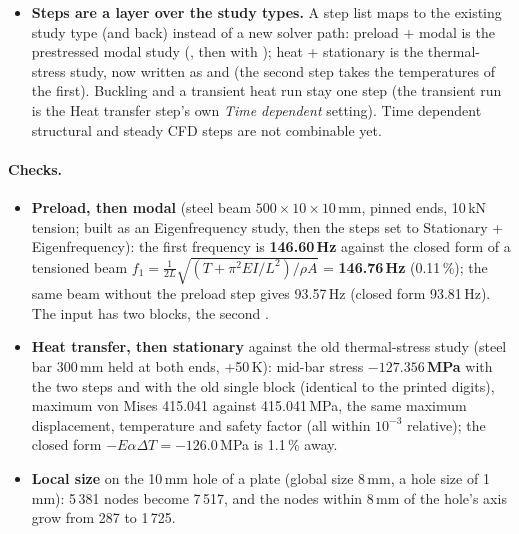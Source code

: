 \begin{itemize}[nosep]
        is refused with the reason. Gmsh is not installed here, so the Gmsh route is not built. The mesh worker of the
        mesh-time work passes the property on.
  \item \textbf{Steps are a layer over the study types.} A step list maps to the existing study type (and back) instead of a new
        solver path: preload + modal is the prestressed modal study (, then  with
        ); heat + stationary is the thermal-stress study, now written as 
        and  (the second step takes the temperatures of the first). Buckling and a transient heat run stay one
        step (the transient run is the Heat transfer step's own \emph{Time dependent} setting). Time dependent structural and
        steady CFD steps are not combinable yet.
\end{itemize}

\paragraph{Checks.}
\begin{itemize}[nosep]
  \item \textbf{Preload, then modal} (steel beam $500\times10\times10$\,mm, pinned ends, 10\,kN tension; built as an
        Eigenfrequency study, then the steps set to Stationary + Eigenfrequency): the first frequency is
        \textbf{146.60\,Hz} against the closed form of a tensioned beam $f_1=\tfrac{1}{2L}\sqrt{(T+\pi^2EI/L^2)/\rho A}$
        = \textbf{146.76\,Hz} (0.11\,\%); the same beam without the preload step gives 93.57\,Hz (closed form 93.81\,Hz).
        The input has two  blocks, the second .
  \item \textbf{Heat transfer, then stationary} against the old thermal-stress study (steel bar 300\,mm held at both ends,
        +50\,K): mid-bar stress \textbf{$-127.356$\,MPa} with the two steps and with the old single block (identical to the
        printed digits), maximum von Mises 415.041 against 415.041\,MPa, the same maximum displacement, temperature and
        safety factor (all within $10^{-3}$ relative); the closed form $-E\alpha\Delta T=-126.0$\,MPa is 1.1\,\% away.
  \item \textbf{Local size} on the 10\,mm hole of a plate (global size 8\,mm, a hole size of 1\,mm): 5\,381 nodes become
        7\,517, and the nodes within 8\,mm of the hole's axis grow from 287 to 1\,725.
\end{itemize}

